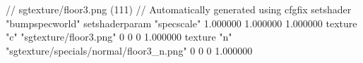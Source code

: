 // sgtexture/floor3.png (111)
// Automatically generated using cfgfix
setshader "bumpspecworld"
setshaderparam "specscale" 1.000000 1.000000 1.000000
texture "c" "sgtexture/floor3.png" 0 0 0 1.000000
texture "n" "sgtexture/specials/normal/floor3_n.png" 0 0 0 1.000000

